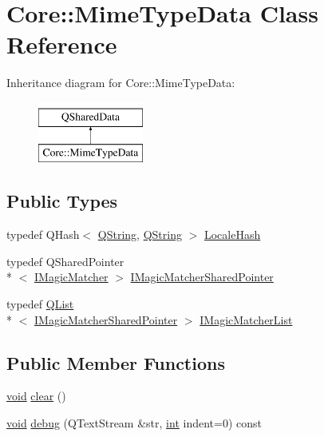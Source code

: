 \hypertarget{class_core_1_1_mime_type_data}{\section{Core\-:\-:Mime\-Type\-Data Class Reference}
\label{class_core_1_1_mime_type_data}
}
Inheritance diagram for Core\-:\-:Mime\-Type\-Data\-:\begin{figure}[H]
\begin{center}
\leavevmode
\includegraphics[height=2.000000cm]{class_core_1_1_mime_type_data}
\end{center}
\end{figure}
\subsection*{Public Types}
\begin{DoxyCompactItemize}
\item 
typedef Q\-Hash$<$ \hyperlink{group___u_a_v_objects_plugin_gab9d252f49c333c94a72f97ce3105a32d}{Q\-String}, \hyperlink{group___u_a_v_objects_plugin_gab9d252f49c333c94a72f97ce3105a32d}{Q\-String} $>$ \hyperlink{group___core_plugin_gabaf932c31842b2da7fc0e9821b5411dd}{Locale\-Hash}
\item 
typedef Q\-Shared\-Pointer\\*
$<$ \hyperlink{class_core_1_1_i_magic_matcher}{I\-Magic\-Matcher} $>$ \hyperlink{group___core_plugin_ga8fa7db2543f765d51cec31286aedb04c}{I\-Magic\-Matcher\-Shared\-Pointer}
\item 
typedef \hyperlink{class_q_list}{Q\-List}\\*
$<$ \hyperlink{group___core_plugin_ga8fa7db2543f765d51cec31286aedb04c}{I\-Magic\-Matcher\-Shared\-Pointer} $>$ \hyperlink{group___core_plugin_ga01712cfcc6b7a1dd9c6a1163064fc3d6}{I\-Magic\-Matcher\-List}
\end{DoxyCompactItemize}
\subsection*{Public Member Functions}
\begin{DoxyCompactItemize}
\item 
\hyperlink{group___u_a_v_objects_plugin_ga444cf2ff3f0ecbe028adce838d373f5c}{void} \hyperlink{group___core_plugin_ga696ca77d0eee7564afa621295c65a8d4}{clear} ()
\item 
\hyperlink{group___u_a_v_objects_plugin_ga444cf2ff3f0ecbe028adce838d373f5c}{void} \hyperlink{group___core_plugin_gaa64a9e20765f2b6ebd9fff06054fc469}{debug} (Q\-Text\-Stream \&str, \hyperlink{ioapi_8h_a787fa3cf048117ba7123753c1e74fcd6}{int} indent=0) const 
\end{DoxyCompactItemize}
